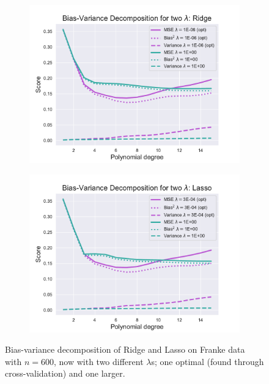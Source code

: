 \documentclass[twocolumn,english,notitlepage]{article}
\begin{document}
            \begin{figure}[ht]
                \begin{subfigure}{\linewidth}
                    \centering
                    \includegraphics[width=\linewidth]{BS_bias_var_two_lmbdas_Ridge.pdf}
                \end{subfigure}
                \begin{subfigure}{\linewidth}
                    \centering
                    \includegraphics[width=\linewidth]{BS_bias_var_two_lmbdas_Lasso.pdf}
                \end{subfigure}
                \caption{Bias-variance decomposition of Ridge and Lasso on Franke data with $n=600$, now with two different $\lambda$s; one optimal (found through cross-validation) and one larger.}
                \label{res:fig:bs_bias_var_two_lmbdas_Ridge_Lasso}
            \end{figure}
\end{document}

